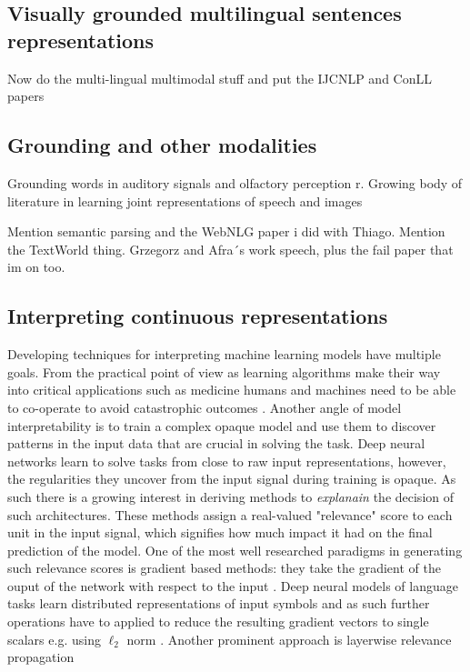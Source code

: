 \subsection{Visually grounded multilingual sentences representations}
Now do the multi-lingual multimodal stuff and put the IJCNLP and ConLL papers

\subsection{Grounding and other modalities}
Grounding words in auditory signals \cite{kiela2015multi,lopopolo2015sound} and olfactory perception \cite{kiela2015grounding}r. Growing body of literature in learning joint representations of speech and images \cite{harwath2016unsupervised,chrupala2017representations,harwath2018jointly}


Mention semantic parsing and the WebNLG paper i did with Thiago. Mention the TextWorld thing. Grzegorz and Afra´s work speech, plus the fail paper that im on too.


\subsection{Interpreting continuous representations}
Developing techniques for interpreting machine learning models have multiple goals. From the practical point of view as learning algorithms  make their way into critical applications such as medicine humans and machines need to be able to co-operate to avoid catastrophic outcomes \cite{caruana2015intelligible}. Another angle of model interpretability is to train a complex opaque model and use them to discover patterns in the input data that are crucial in solving the task. Deep neural networks learn to solve tasks from close to raw input representations, however, the regularities
they uncover from the input signal during training is opaque. As such there is a growing interest in deriving methods to \emph{explanain} the decision of such architectures.  These methods 
assign a real-valued "relevance" score to each unit in the input signal, which signifies how much impact it had on the final prediction of the model. One of the most well researched paradigms
in generating such relevance scores is gradient based methods: they take the gradient of the ouput of the network with respect to the input \cite{simonyan2013deep}. 
Deep neural models of language tasks learn distributed representations of input symbols and as such further operations have to applied to reduce the resulting gradient vectors to 
single scalars e.g. using $\ell_2$ norm  \cite{bansal2016ask}. Another prominent approach is layerwise relevance propagation \cite{bach2015pixel} 

